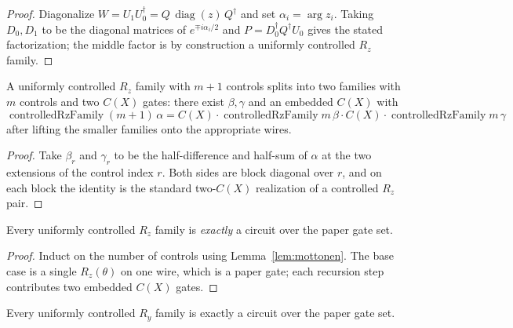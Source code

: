 \begin{proof}
  \leanok
  Diagonalize $W = U_1 U_0^\dagger = Q\,\operatorname{diag}(z)\,Q^\dagger$ and
  set $\alpha_i = \arg z_i$.  Taking $D_{0}, D_1$ to be the diagonal matrices
  of $e^{\mp i\alpha_i/2}$ and $P = D_0^\dagger Q^\dagger U_0$ gives the stated
  factorization; the middle factor is by construction a uniformly controlled
  $R_z$ family.
\end{proof}

\begin{lemma}
  \label{lem:mottonen}
  \leanok
  A uniformly controlled $R_z$ family with $m+1$ controls splits into two
  families with $m$ controls and two $C(X)$ gates: there exist $\beta, \gamma$
  and an embedded $C(X)$ with
  \[
    \operatorname{controlledRzFamily}(m{+}1)\,\alpha
      = C(X)\cdot \operatorname{controlledRzFamily} m\, \beta
        \cdot C(X)\cdot \operatorname{controlledRzFamily} m\, \gamma
  \]
  after lifting the smaller families onto the appropriate wires.
\end{lemma}

\begin{proof}
  \leanok
  Take $\beta_r$ and $\gamma_r$ to be the half-difference and half-sum of
  $\alpha$ at the two extensions of the control index $r$.  Both sides are
  block diagonal over $r$, and on each block the identity is the standard
  two-$C(X)$ realization of a controlled $R_z$ pair.
\end{proof}

\begin{lemma}
  \label{lem:crz_family_synth}
  \leanok
  Every uniformly controlled $R_z$ family is \emph{exactly} a circuit over the
  paper gate set.
\end{lemma}

\begin{proof}
  \leanok
  Induct on the number of controls using Lemma~\ref{lem:mottonen}.  The base
  case is a single $R_z(\theta)$ on one wire, which is a paper gate; each
  recursion step contributes two embedded $C(X)$ gates.
\end{proof}

\begin{lemma}
  \label{lem:cry_family_synth}
  \leanok
  Every uniformly controlled $R_y$ family is exactly a circuit over the paper
  gate set.
\end{lemma}


